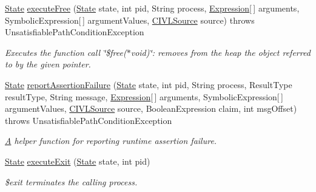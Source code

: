 \begin{DoxyCompactItemize}
\item 
\hyperlink{interfaceedu_1_1udel_1_1cis_1_1vsl_1_1civl_1_1state_1_1IF_1_1State}{State} \hyperlink{classedu_1_1udel_1_1cis_1_1vsl_1_1civl_1_1library_1_1common_1_1BaseLibraryExecutor_a3ae5405b72be6866ff1b81f704327be1}{execute\+Free} (\hyperlink{interfaceedu_1_1udel_1_1cis_1_1vsl_1_1civl_1_1state_1_1IF_1_1State}{State} state, int pid, String process, \hyperlink{interfaceedu_1_1udel_1_1cis_1_1vsl_1_1civl_1_1model_1_1IF_1_1expression_1_1Expression}{Expression}\mbox{[}$\,$\mbox{]} arguments, Symbolic\+Expression\mbox{[}$\,$\mbox{]} argument\+Values, \hyperlink{interfaceedu_1_1udel_1_1cis_1_1vsl_1_1civl_1_1model_1_1IF_1_1CIVLSource}{C\+I\+V\+L\+Source} source)  throws Unsatisfiable\+Path\+Condition\+Exception 
\begin{DoxyCompactList}\small\item\em Executes the function call \char`\"{}\$free($\ast$void)\char`\"{}\+: removes from the heap the object referred to by the given pointer. \end{DoxyCompactList}\item 
\hyperlink{interfaceedu_1_1udel_1_1cis_1_1vsl_1_1civl_1_1state_1_1IF_1_1State}{State} \hyperlink{classedu_1_1udel_1_1cis_1_1vsl_1_1civl_1_1library_1_1common_1_1BaseLibraryExecutor_a022003b2b3b72464022933a1961bd97e}{report\+Assertion\+Failure} (\hyperlink{interfaceedu_1_1udel_1_1cis_1_1vsl_1_1civl_1_1state_1_1IF_1_1State}{State} state, int pid, String process, Result\+Type result\+Type, String message, \hyperlink{interfaceedu_1_1udel_1_1cis_1_1vsl_1_1civl_1_1model_1_1IF_1_1expression_1_1Expression}{Expression}\mbox{[}$\,$\mbox{]} arguments, Symbolic\+Expression\mbox{[}$\,$\mbox{]} argument\+Values, \hyperlink{interfaceedu_1_1udel_1_1cis_1_1vsl_1_1civl_1_1model_1_1IF_1_1CIVLSource}{C\+I\+V\+L\+Source} source, Boolean\+Expression claim, int msg\+Offset)  throws Unsatisfiable\+Path\+Condition\+Exception 
\begin{DoxyCompactList}\small\item\em \hyperlink{structA}{A} helper function for reporting runtime assertion failure. \end{DoxyCompactList}\item 
\hyperlink{interfaceedu_1_1udel_1_1cis_1_1vsl_1_1civl_1_1state_1_1IF_1_1State}{State} \hyperlink{classedu_1_1udel_1_1cis_1_1vsl_1_1civl_1_1library_1_1common_1_1BaseLibraryExecutor_ab134d63cb77125549d1bda3ec39425aa}{execute\+Exit} (\hyperlink{interfaceedu_1_1udel_1_1cis_1_1vsl_1_1civl_1_1state_1_1IF_1_1State}{State} state, int pid)
\begin{DoxyCompactList}\small\item\em \$exit terminates the calling process. \end{DoxyCompactList}\end{DoxyCompactItemize}
